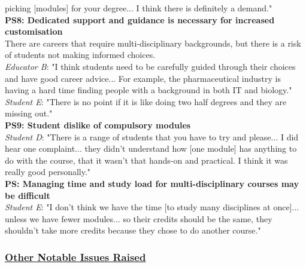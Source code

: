picking [modules] for your degree... I think there is definitely a demand."
\vspace{0.25cm}\\
\textbf{PS8: Dedicated support and guidance is necessary for increased customisation}\\
There are careers that require multi-disciplinary backgrounds, but there is a risk of 
students not making informed choices.\\
\textit{Educator B}: "I think students need to be carefully guided through their choices and 
have good career advice... For example, the pharmaceutical industry is having a hard time 
finding people with a background in both IT and biology."\\
\textit{Student E}: "There is no point if it is like doing two half degrees and they are missing out."
\vspace{0.25cm}\\
\textbf{PS9: Student dislike of compulsory modules}\\
\textit{Student D}: "There is a range of students that you have to try and please...
I did hear one complaint... they didn't understand how [one module] has anything to do with the course, 
that it wasn't that hands-on and practical. I think it was really good personally."
\vspace{0.25cm}\\
\textbf{PS: Managing time and study load for multi-disciplinary courses may be difficult}\\
\textit{Student E}: "I don't think we have the time [to study many disciplines at once]... unless 
we have fewer modules... so their credits should be the same, they shouldn't take more credits 
because they chose to do another course."

\subsubsection{\underline{Other Notable Issues Raised}}

